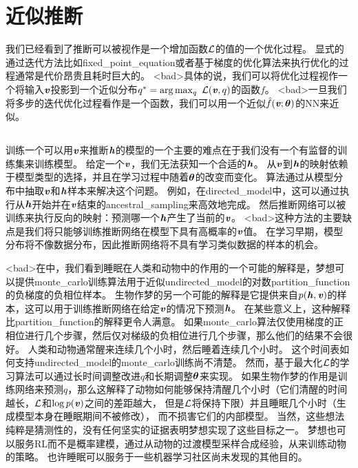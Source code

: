 \section{近似推断}
\label{sec:learned_approximate_inference}

我们已经看到了推断可以被视作是一个增加函数$\mathcal{L}$的值的一个优化过程。
显式的通过迭代方法比如\gls{fixed_point_equation}或者基于梯度的优化算法来执行优化的过程通常是代价昂贵且耗时巨大的。
<bad>具体的说，我们可以将优化过程视作一个将输入$\boldsymbol{\mathit{v}}$投影到一个近似分布$q^* = \arg\max_q\  \mathcal{L}(\boldsymbol{\mathit{v}},q)$的函数$f$。
<bad>一旦我们将多步的迭代优化过程看作是一个函数，我们可以用一个近似$\hat{f}(\boldsymbol{\mathit{v}};{\boldsymbol{\theta}})$的\gls{NN}来近似。


\subsection{}
\label{sec:wake_sleep}

训练一个可以用$\boldsymbol{\mathit{v}}$来推断$\boldsymbol{\mathit{h}}$的模型的一个主要的难点在于我们没有一个有监督的训练集来训练模型。
给定一个$\boldsymbol{\mathit{v}}$，我们无法获知一个合适的$\boldsymbol{\mathit{h}}$。
从$\boldsymbol{\mathit{v}}$到$\boldsymbol{\mathit{h}}$的映射依赖于模型类型的选择，并且在学习过程中随着${\boldsymbol{\theta}}$的改变而变化。
算法\citep{Hinton95,Frey96}通过从模型分布中抽取$\boldsymbol{\mathit{v}}$和$\boldsymbol{\mathit{h}}$样本来解决这个问题。
例如，在\gls{directed_model}中，这可以通过执行从$\boldsymbol{\mathit{h}}$开始并在$\boldsymbol{\mathit{v}}$结束的\gls{ancestral_sampling}来高效地完成。
然后推断网络可以被训练来执行反向的映射：预测哪一个$\boldsymbol{\mathit{h}}$产生了当前的$\boldsymbol{\mathit{v}}$。
<bad>这种方法的主要缺点是我们将只能够训练推断网络在模型下具有高概率的$\boldsymbol{\mathit{v}}$值。
在学习早期，模型分布将不像数据分布，因此推断网络将不具有学习类似数据的样本的机会。


<bad>在中，我们看到睡眠在人类和动物中的作用的一个可能的解释是，梦想可以提供\gls{monte_carlo}训练算法用于近似\gls{undirected_model}的对数\gls{partition_function}的负梯度的负相位样本。
生物作梦的另一个可能的解释是它提供来自$p(\boldsymbol{\mathit{h}},\boldsymbol{\mathit{v}})$的样本，这可以用于训练推断网络在给定$\boldsymbol{\mathit{v}}$的情况下预测$\boldsymbol{\mathit{h}}$。
在某些意义上，这种解释比\gls{partition_function}的解释更令人满意。
如果\gls{monte_carlo}算法仅使用梯度的正相位进行几个步骤，然后仅对梯级的负相位进行几个步骤，那么他们的结果不会很好。
人类和动物通常醒来连续几个小时，然后睡着连续几个小时。
这个时间表如何支持\gls{undirected_model}的\gls{monte_carlo}训练尚不清楚。
然而，基于最大化$\mathcal{L}$的学习算法可以通过长时间调整改进$q$和长期调整${\boldsymbol{\theta}}$来实现。
如果生物作梦的作用是训练网络来预测$q$，那么这解释了动物如何能够保持清醒几个小时（它们清醒的时间越长，$\mathcal{L}$和$\log p(\boldsymbol{\mathit{v}})$之间的差距越大， 但是$\mathcal{L}$将保持下限）并且睡眠几个小时（生成模型本身在睡眠期间不被修改）， 而不损害它们的内部模型。
当然，这些想法纯粹是猜测性的，没有任何坚实的证据表明梦想实现了这些目标之一。
梦想也可以服务\gls{RL}而不是概率建模，通过从动物的过渡模型采样合成经验，从来训练动物的策略。
也许睡眠可以服务于一些机器学习社区尚未发现的其他目的。



